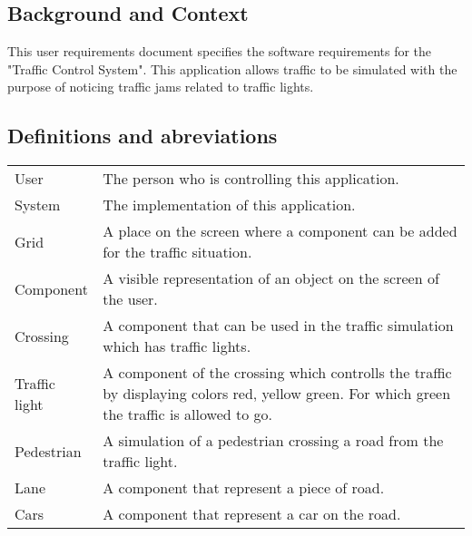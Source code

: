 \documentclass[a4paper,11pt]{article}
\title{\Title}
\author{}
\date{\today}
\begin{document}
\begin{titlepage}
\maketitle
\end{titlepage}

  	\linespread{1.15} %
    
  	\subsection*{Background and Context}
  	This user requirements document specifies the software requirements for the "Traffic Control System". This application allows traffic to be simulated with the purpose of noticing traffic jams related to traffic lights.
  	
  	\subsection*{Definitions and abreviations}
  	\begin{longtable}[l]{p{50pt} p{350pt}} 
  		User & The person who is controlling this application.\\
  		System & The implementation of this application.\\
  		Grid & A place on the screen where a component can be added for the traffic situation.\\
  		Component & A visible representation of an object on the screen of the user.\\
  		Crossing & A component that can be used in the traffic simulation which has traffic lights.\\
  		Traffic light & A component of the crossing which controlls the traffic by displaying colors red, yellow green. For which green the traffic is allowed to go.\\
  		Pedestrian & A simulation of a pedestrian crossing a road from the traffic light.\\
  		Lane & A component that represent a piece of road.\\
  		Cars & A component that represent a car on the road.\\
  	\end{longtable}
  	
  	\tableofcontents
  	\newpage
  	
  	
  	
  	
    
    
    
    
\end{document}
